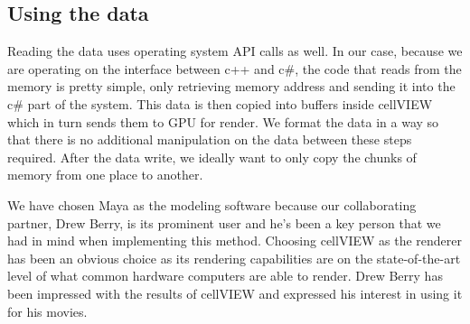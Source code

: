 \documentclass[
  digital, %
  table,   %
  nolof,     %
  nolot,     %
]{fithesis3}
\begin{document}
\subsection{Using the data}
Reading the data uses operating system API calls as well. In our case, because we are operating on the interface between c++ and c\#, the code that reads from the memory is pretty simple, only retrieving memory address and sending it into the c\# part of the system. This data is then copied into buffers inside cellVIEW which in turn sends them to GPU for render. We format the data in a way so that there is no additional manipulation on the data between these steps required. After the data write, we ideally want to only copy the chunks of memory from one place to another.

We have chosen Maya as the modeling software because our collaborating partner, Drew Berry, is its prominent user and he's been a key person that we had in mind when implementing this method. Choosing cellVIEW as the renderer has been an obvious choice as its rendering capabilities are on the state-of-the-art level of what common hardware computers are able to render. Drew Berry has been impressed with the results of cellVIEW and expressed his interest in using it for his movies.

\end{document}
